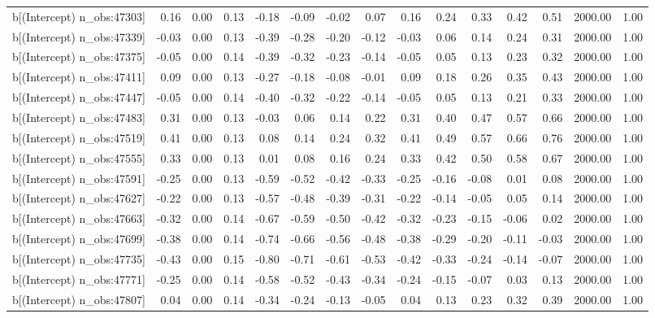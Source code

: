 \begin{table}[ht]
\begin{tabular}{rrrrrrrrrrrrrrr}
  b[(Intercept) n\_obs:47303] & 0.16 & 0.00 & 0.13 & -0.18 & -0.09 & -0.02 & 0.07 & 0.16 & 0.24 & 0.33 & 0.42 & 0.51 & 2000.00 & 1.00 \\ 
  b[(Intercept) n\_obs:47339] & -0.03 & 0.00 & 0.13 & -0.39 & -0.28 & -0.20 & -0.12 & -0.03 & 0.06 & 0.14 & 0.24 & 0.31 & 2000.00 & 1.00 \\ 
  b[(Intercept) n\_obs:47375] & -0.05 & 0.00 & 0.14 & -0.39 & -0.32 & -0.23 & -0.14 & -0.05 & 0.05 & 0.13 & 0.23 & 0.32 & 2000.00 & 1.00 \\ 
  b[(Intercept) n\_obs:47411] & 0.09 & 0.00 & 0.13 & -0.27 & -0.18 & -0.08 & -0.01 & 0.09 & 0.18 & 0.26 & 0.35 & 0.43 & 2000.00 & 1.00 \\ 
  b[(Intercept) n\_obs:47447] & -0.05 & 0.00 & 0.14 & -0.40 & -0.32 & -0.22 & -0.14 & -0.05 & 0.05 & 0.13 & 0.21 & 0.33 & 2000.00 & 1.00 \\ 
  b[(Intercept) n\_obs:47483] & 0.31 & 0.00 & 0.13 & -0.03 & 0.06 & 0.14 & 0.22 & 0.31 & 0.40 & 0.47 & 0.57 & 0.66 & 2000.00 & 1.00 \\ 
  b[(Intercept) n\_obs:47519] & 0.41 & 0.00 & 0.13 & 0.08 & 0.14 & 0.24 & 0.32 & 0.41 & 0.49 & 0.57 & 0.66 & 0.76 & 2000.00 & 1.00 \\ 
  b[(Intercept) n\_obs:47555] & 0.33 & 0.00 & 0.13 & 0.01 & 0.08 & 0.16 & 0.24 & 0.33 & 0.42 & 0.50 & 0.58 & 0.67 & 2000.00 & 1.00 \\ 
  b[(Intercept) n\_obs:47591] & -0.25 & 0.00 & 0.13 & -0.59 & -0.52 & -0.42 & -0.33 & -0.25 & -0.16 & -0.08 & 0.01 & 0.08 & 2000.00 & 1.00 \\ 
  b[(Intercept) n\_obs:47627] & -0.22 & 0.00 & 0.13 & -0.57 & -0.48 & -0.39 & -0.31 & -0.22 & -0.14 & -0.05 & 0.05 & 0.14 & 2000.00 & 1.00 \\ 
  b[(Intercept) n\_obs:47663] & -0.32 & 0.00 & 0.14 & -0.67 & -0.59 & -0.50 & -0.42 & -0.32 & -0.23 & -0.15 & -0.06 & 0.02 & 2000.00 & 1.00 \\ 
  b[(Intercept) n\_obs:47699] & -0.38 & 0.00 & 0.14 & -0.74 & -0.66 & -0.56 & -0.48 & -0.38 & -0.29 & -0.20 & -0.11 & -0.03 & 2000.00 & 1.00 \\ 
  b[(Intercept) n\_obs:47735] & -0.43 & 0.00 & 0.15 & -0.80 & -0.71 & -0.61 & -0.53 & -0.42 & -0.33 & -0.24 & -0.14 & -0.07 & 2000.00 & 1.00 \\ 
  b[(Intercept) n\_obs:47771] & -0.25 & 0.00 & 0.14 & -0.58 & -0.52 & -0.43 & -0.34 & -0.24 & -0.15 & -0.07 & 0.03 & 0.13 & 2000.00 & 1.00 \\ 
  b[(Intercept) n\_obs:47807] & 0.04 & 0.00 & 0.14 & -0.34 & -0.24 & -0.13 & -0.05 & 0.04 & 0.13 & 0.23 & 0.32 & 0.39 & 2000.00 & 1.00 \\ 

\end{tabular}
\end{table}

